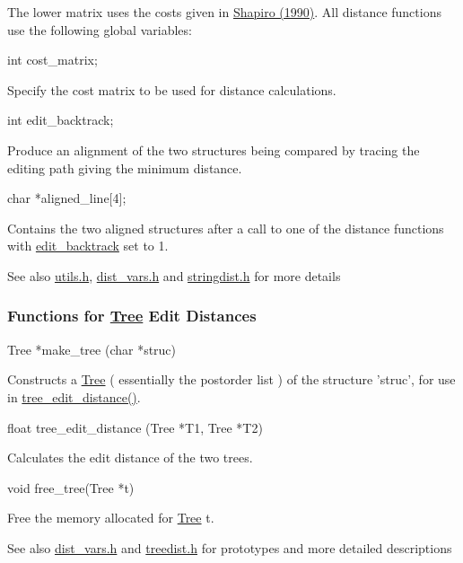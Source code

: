 The lower matrix uses the costs given in \hyperlink{mp__ref_shapiro_90}{Shapiro (1990)}. All distance functions use the following global variables:

\begin{DoxyVerb}
int  cost_matrix;
\end{DoxyVerb}
 Specify the cost matrix to be used for distance calculations. 

\begin{DoxyVerb}
int   edit_backtrack;
\end{DoxyVerb}
 Produce an alignment of the two structures being compared by tracing the editing path giving the minimum distance. 

\begin{DoxyVerb}
char *aligned_line[4];
\end{DoxyVerb}
 Contains the two aligned structures after a call to one of the distance functions with \hyperlink{dist__vars_8h_aa03194c513af6b860e7b33e370b82bdb}{edit\_\-backtrack} set to 1. 

\begin{DoxySeeAlso}{See also}
\hyperlink{utils_8h}{utils.h}, \hyperlink{dist__vars_8h}{dist\_\-vars.h} and \hyperlink{stringdist_8h}{stringdist.h} for more details
\end{DoxySeeAlso}
\subsubsection*{Functions for \hyperlink{structTree}{Tree} Edit Distances}

\begin{DoxyVerb}
Tree   *make_tree (char *struc)
\end{DoxyVerb}
 Constructs a \hyperlink{structTree}{Tree} ( essentially the postorder list ) of the structure 'struc', for use in \hyperlink{treedist_8h_a3b21f1925f7071f46d93431a835217bb}{tree\_\-edit\_\-distance()}. 

\begin{DoxyVerb}
float   tree_edit_distance (Tree *T1,
                            Tree *T2) 
\end{DoxyVerb}
 Calculates the edit distance of the two trees. 

\begin{DoxyVerb}
void    free_tree(Tree *t)
\end{DoxyVerb}
 Free the memory allocated for \hyperlink{structTree}{Tree} t. 

\begin{DoxySeeAlso}{See also}
\hyperlink{dist__vars_8h}{dist\_\-vars.h} and \hyperlink{treedist_8h}{treedist.h} for prototypes and more detailed descriptions
\end{DoxySeeAlso}
